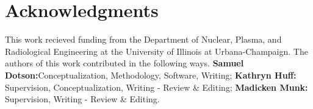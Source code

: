 \section{Acknowledgments}
This work recieved funding from the Department of Nuclear, Plasma, and
Radiological Engineering at the University of Illinois at Urbana-Champaign. The
authors of this work contributed in the following ways. 
\textbf{Samuel Dotson:}Conceptualization, Methodology, Software, Writing; 
\textbf{Kathryn Huff:} Supervision, Conceptualization, Writing - Review \& Editing; 
\textbf{Madicken Munk:} Supervision, Writing - Review \& Editing.

